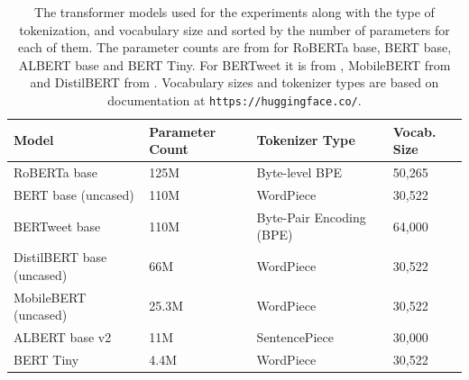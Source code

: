 \begin{table}[ht]
    \captionsetup{font=small}
    \small
    \centering
    \begin{tabularx}{\textwidth}{|l|X|l|X|}
        \hline
        \rowcolor[gray]{0.7}
        \textbf{Model}            & \textbf{Parameter Count} & \textbf{Tokenizer Type}  & \textbf{Vocab. Size} \\
        \hline
        RoBERTa base              & 125M                     & Byte-level BPE           & 50,265               \\
        \rowcolor[gray]{0.9}
        BERT base (uncased)       & 110M                     & WordPiece                & 30,522               \\
        BERTweet base             & 110M                     & Byte-Pair Encoding (BPE) & 64,000               \\
        \rowcolor[gray]{0.9}
        DistilBERT base (uncased) & 66M                      & WordPiece                & 30,522               \\
        MobileBERT (uncased)      & 25.3M                    & WordPiece                & 30,522               \\
        \rowcolor[gray]{0.9}
        ALBERT base v2            & 11M                      & SentencePiece            & 30,000               \\
        BERT Tiny                 & 4.4M                     & WordPiece                & 30,522               \\
        \hline
    \end{tabularx}
    \caption{The transformer models used for the experiments along with the type of tokenization, and vocabulary size and sorted by the number of parameters for each of them. The parameter counts are from \cite{bhargavaGeneralizationNLIWays2021} for RoBERTa base, BERT base, ALBERT base and BERT Tiny. For BERTweet it is from \cite{nguyenBERTweetPretrainedLanguage2020}, MobileBERT from \cite{sunMobileBERTCompactTaskAgnostic2020} and DistilBERT from \cite{sanhDistilBERTDistilledVersion2020}. Vocabulary sizes and tokenizer types are based on documentation at \texttt{https://huggingface.co/}.}
    \label{tab: model_dtls}
\end{table}

